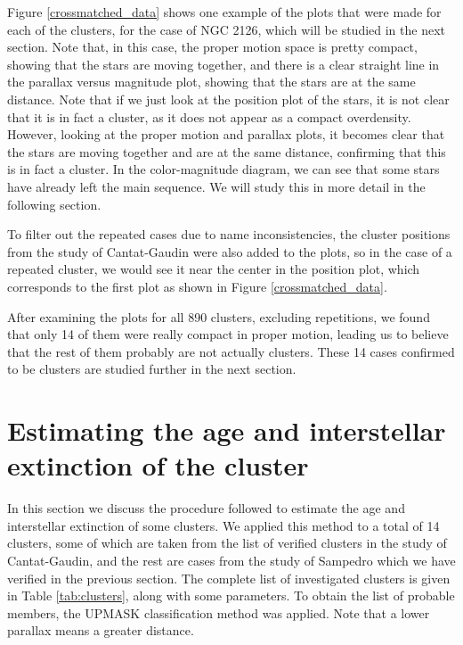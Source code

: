 \documentclass[twocolumn]{revtex4}
\begin{document}
Figure \ref{crossmatched_data} shows one example of the plots that were made for each of the clusters, for the case of NGC 2126, which will be studied in the next section. Note that, in this case, the proper motion space is pretty compact, showing that the stars are moving together, and there is a clear straight line in the parallax versus magnitude plot, showing that the stars are at the same distance.
Note that if we just look at the position plot of the stars, it is not clear that it is in fact a cluster, as it does not appear as a compact overdensity. However, looking at the proper motion and parallax plots, it becomes clear that the stars are moving together and are at the same distance, confirming that this is in fact a cluster.
In the color-magnitude diagram, we can see that some stars have already left the main sequence. We will study this in more detail in the following section.

To filter out the repeated cases due to name inconsistencies, the cluster positions from the study of Cantat-Gaudin were also added to the plots, so in the case of a repeated cluster, we would see it near the center in the position plot, which corresponds to the first plot as shown in Figure \ref{crossmatched_data}.

After examining the plots for all 890 clusters, excluding repetitions, we found that only 14 of them were really compact in proper motion, leading us to believe that the rest of them probably are not actually clusters. These 14 cases confirmed to be clusters are studied further in the next section.

\section{Estimating the age and interstellar extinction of the cluster}
In this section we discuss the procedure followed to estimate the age and interstellar extinction of some clusters. We applied this method to a total of 14 clusters, some of which are taken from the list of verified clusters in the study of Cantat-Gaudin, and the rest are cases from the study of Sampedro which we have verified in the previous section. The complete list of investigated clusters is given in Table \ref{tab:clusters}, along with some parameters. To obtain the list of probable members, the UPMASK classification method \cite{cantat-gaudin} was applied.
Note that a lower parallax means a greater distance.
\end{document}
